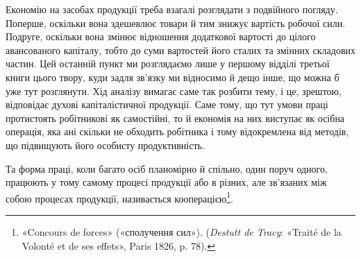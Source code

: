 
Економію на засобах продукції треба взагалі розглядати з
подвійного погляду. Поперше, оскільки вона здешевлює товари
й тим знижує вартість робочої сили. Подруге, оскільки вона змінює
відношення додаткової вартості до цілого авансованого капіталу,
тобто до суми вартостей його сталих та змінних складових
частин. Цей останній пункт ми розглядаємо лише у першому
відділі третьої книги цього твору, куди задля зв’язку ми відносимо
й дещо інше, що можна б уже тут розглянути. Хід аналізу
вимагає саме так розбити тему, і це, зрештою, відповідає духові
капіталістичної продукції. Саме тому, що тут умови праці протистоять
робітникові як самостійні, то й економія на них виступає
як осібна операція, яка ані скільки не обходить робітника і
тому відокремлена від методів, що підвищують його особисту продуктивність.

Та форма праці, коли багато осіб планомірно й спільно, один
поруч одного, працюють у тому самому процесі продукції або в різних,
але зв’язаних між собою процесах продукції, називається
кооперацією\footnote{
«Concours de forces» («сполучення сил»). (\emph{Destutt de Tracy}: «Traité
de la Volonté et de ses effets», Paris 1826, p. 78).
}.

